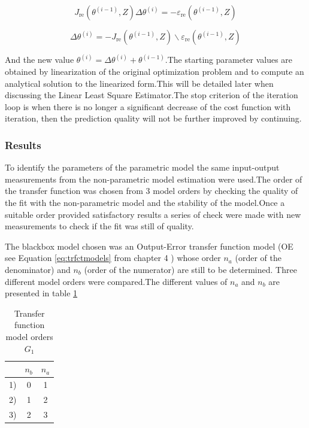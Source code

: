\documentclass[a4paper,12pt]{report}
\numberwithin{equation}{section}
\begin{document}
$$
J_{\mathrm{re}}\left(\theta^{(i-1)}, Z\right) \Delta \theta^{(i)}=-\varepsilon_{\mathrm{re}}\left(\theta^{(i-1)}, Z\right)
$$

\begin{equation}\label{eq;thethaMl}
\Delta \theta^{(i)}=-J_{\mathrm{re}}\left(\theta^{(i-1)}, Z\right) \backslash \varepsilon_{\mathrm{re}}\left(\theta^{(i-1)}, Z\right)
\end{equation}


\noindent
And the new value $\theta^{(i)}=\Delta \theta^{(i)} + \theta^{(i-1)} $.The starting parameter values are obtained by linearization of the original optimization problem and to compute an analytical solution to the linearized form.This will be detailed later when discussing the Linear Least Square Estimator.The stop criterion of the iteration loop is when there is no longer a significant decrease of the cost function with iteration, then the prediction quality will not be further improved by continuing.

\subsubsection{Results}
To identify the parameters of the parametric model the same input-output measurements from the non-parametric model estimation were used.The order of the transfer function was chosen from 3 model orders  by checking the quality of the fit with the non-parametric model and the stability of the model.Once a suitable order provided satisfactory results a series of check were made with new measurements to check if the fit was still of quality.

The blackbox model chosen was an Output-Error transfer function model (OE see Equation \ref{eq:trfctmodels} from chapter 4 ) whose order $n_{a}$ (order of the denominator)  and $n_{b}$
 (order of the numerator) are still to be determined. Three different model orders
were compared.The different values of  $n_{a}$ and $n_{b}$ are  presented
in table \ref{table:model order}


\begin{table}[H]
\centering
\begin{tabular}{|c|c|c|}
\hline  & $n_{b}$ & $n_{a}$ \\
\hline 1) & 0 & 1  \\
\hline 2) & 1 & 2  \\
\hline 3) & 2 & 3  \\
\hline
\end{tabular}
\caption{Transfer function model orders $G_{1}$}
\label{table:model order}
\end{table}
\end{document}
